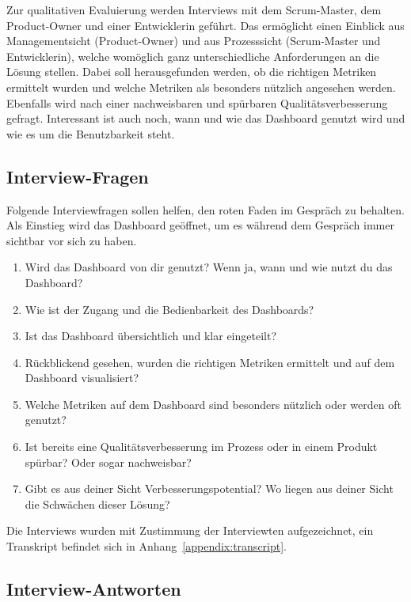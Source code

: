 Zur qualitativen Evaluierung werden Interviews mit dem Scrum-Master, dem Product-Owner und einer Entwicklerin geführt.
Das ermöglicht einen Einblick aus Managementsicht (Product-Owner) und aus Prozesssicht (Scrum-Master und Entwicklerin), welche womöglich ganz unterschiedliche Anforderungen an die Lösung stellen.
Dabei soll herausgefunden werden, ob die richtigen Metriken ermittelt wurden und welche Metriken als besonders nützlich angesehen werden.
Ebenfalls wird nach einer nachweisbaren und spürbaren Qualitätsverbesserung gefragt.
Interessant ist auch noch, wann und wie das Dashboard genutzt wird und wie es um die Benutzbarkeit steht.

\subsection{Interview-Fragen}

Folgende Interviewfragen sollen helfen, den roten Faden im Gespräch zu behalten.
Als Einstieg wird das Dashboard geöffnet, um es während dem Gespräch immer sichtbar vor sich zu haben.

\begin{enumerate}
    \item Wird das Dash\-board von dir genutzt? Wenn ja, wann und wie nutzt du das Dashboard?
    \item Wie ist der Zugang und die Bedienbarkeit des Dashboards?
    \item Ist das Dashboard übersichtlich und klar eingeteilt?
    \item Rückblickend gesehen, wurden die richtigen Metriken ermittelt und auf dem Dashboard visualisiert?
    \item Welche Metriken auf dem Dashboard sind besonders nützlich oder werden oft genutzt?
    \item Ist bereits eine Qualitätsverbesserung im Prozess oder in einem Produkt spürbar? Oder sogar nachweisbar?
    \item Gibt es aus deiner Sicht Verbesserungspotential? Wo liegen aus deiner Sicht die Schwächen dieser Lösung?
\end{enumerate}

Die Interviews wurden mit Zustimmung der Interviewten aufgezeichnet, ein Transkript befindet sich in Anhang~\ref{appendix:transcript}.

\clearpage
\subsection{Interview-Antworten}

